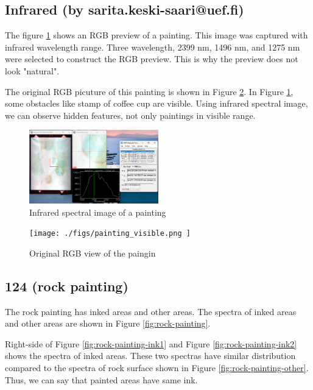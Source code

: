 \subsection{Infrared (by sarita.keski-saari@uef.fi)}

The figure \ref{fig:painting} shows an RGB preview of a painting. This image was captured with infrared wavelength range. Three wavelength, 2399 nm, 1496 nm, and 1275 nm were selected to construct the RGB preview. This is why the preview does not look "natural".

The original RGB picuture of this painting is shown in Figure \ref{fig:painting-org}.
In Figure \ref{fig:painting}, some obstacles like stamp of coffee cup are visible. Using infrared spectral image, we can observe hidden features, not only paintings in visible range.

\begin{figure}[H]
  \centering
  \caption{Infrared spectral image of a painting}
  \label{fig:painting}
  \includegraphics[width=0.5\textwidth]{./figs/painting.png}
\end{figure}

\begin{figure}[H]
  \centering
  \caption{Original RGB view of the paingin}
  \label{fig:painting-org}
  \texttt{[image: ./figs/painting\_visible.png ]}
\end{figure}

\subsection{124 (rock painting)}

The rock painting has inked areas and other areas. The spectra of inked areas and other areas are shown in Figure \ref{fig:rock-painting}.

Right-side of Figure \ref{fig:rock-painting-ink1} and Figure \ref{fig:rock-painting-ink2} shows the spectra of inked areas. These two spectras have similar distribution compared to the spectra of rock surface shown in Figure \ref{fig:rock-painting-other}. Thus, we can say that painted areas have same ink.


